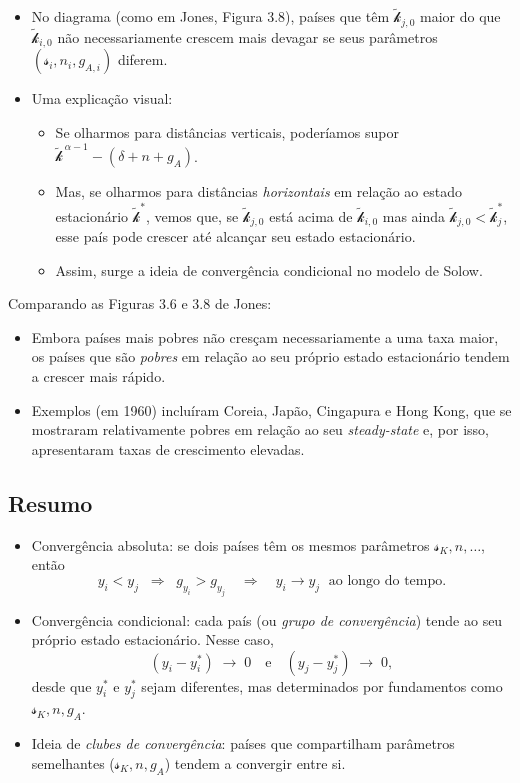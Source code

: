 \documentclass[a4paper,12pt]{article}[abntex2]
\begin{document}
\begin{itemize}
    \item No diagrama (como em Jones, Figura 3.8), países que têm \(\tilde{\mathcal{k}}_{j,0}\) 
    maior do que \(\tilde{\mathcal{k}}_{i,0}\) não necessariamente crescem mais devagar 
    se seus parâmetros \((\mathcal{s}_i, n_i, g_{A,i})\) diferem.
    \item Uma explicação visual:
    \begin{itemize}
        \item Se olharmos para distâncias verticais, poderíamos supor 
        \(\tilde{\mathcal{k}}^{\,\alpha -1} - (\delta + n + g_A)\). 
        \item Mas, se olharmos para distâncias \emph{horizontais} em relação ao 
        estado estacionário \(\tilde{\mathcal{k}}^*\), vemos que, se \(\tilde{\mathcal{k}}_{j,0}\) 
        está acima de \(\tilde{\mathcal{k}}_{i,0}\) mas ainda \(\tilde{\mathcal{k}}_{j,0} < \tilde{\mathcal{k}}_{j}^*\), 
        esse país pode crescer até alcançar seu estado estacionário. 
        \item Assim, surge a ideia de convergência condicional no modelo de Solow.
    \end{itemize}
\end{itemize}

Comparando as Figuras 3.6 e 3.8 de Jones:
\begin{itemize}
    \item Embora países mais pobres não cresçam necessariamente a uma taxa maior, 
    os países que são \emph{pobres} em relação ao seu próprio estado estacionário 
    tendem a crescer mais rápido. 
    \item Exemplos (em 1960) incluíram Coreia, Japão, Cingapura e Hong Kong, 
    que se mostraram relativamente pobres em relação ao seu \emph{steady-state} 
    e, por isso, apresentaram taxas de crescimento elevadas.
\end{itemize}

\subsection{\textbf{Resumo}}

\begin{itemize}
    \item Convergência absoluta: se dois países têm os mesmos parâmetros 
    \(\mathcal{s}_K, n, \dots\), então
    \[
      y_i < y_j \;\;\Longrightarrow\;\; g_{y_i} > g_{y_j}
      \quad\Longrightarrow\quad
      y_i \to y_j \;\text{ ao longo do tempo.}
    \]
    \item Convergência condicional: cada país (ou \emph{grupo de convergência}) 
    tende ao seu próprio estado estacionário. Nesse caso,
    \[
      (y_i - y_i^*) \;\to\; 0 
      \quad \text{e} \quad
      (y_j - y_j^*) \;\to\; 0,
    \]
    desde que \(y_i^*\) e \(y_j^*\) sejam diferentes, mas determinados por 
    fundamentos como \(\mathcal{s}_K, n, g_A\).
    \item Ideia de \emph{clubes de convergência}: países que compartilham 
    parâmetros semelhantes (\(\mathcal{s}_K, n, g_A\)) tendem a convergir entre si.
\end{itemize}
\end{document}
